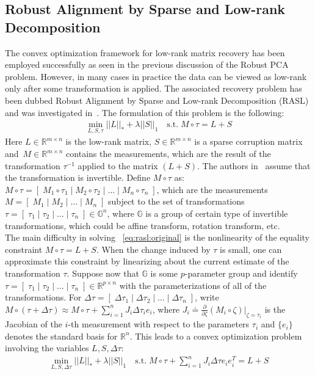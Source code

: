 \subsection{Robust Alignment by Sparse and Low-rank Decomposition}
\label{subsec: RASL}

The convex optimization framework for low-rank matrix recovery has been employed successfully as seen in the previous discussion of the Robust PCA problem. However, in many cases in practice the data can be viewed as low-rank only after some transformation is applied. The associated recovery problem has been dubbed Robust Alignment by Sparse and Low-rank Decomposition (RASL) and was investigated in~\cite{Peng:2010}. The formulation of this problem is the following:
%
\begin{align}
\min_{L, S, \tau}  ||L||_{*} + \lambda||S||_{1} \quad  \text{s.t.} \;  M\circ\tau = L+S
\label{eq:rasl:original}
\end{align}
%
Here $L \in\mathbb{R}^{m\times n}$ is the low-rank matrix, $S\in\mathbb{R}^{m\times n}$ is a sparse corruption matrix and~$M\in\mathbb{R}^{m\times n}$ contains the measurements, which are the result of the transformation $\tau^{-1}$ applied to the matrix $(L+S)$. The authors in~\cite{Peng:2010} assume that the transformation is invertible. Define $M\circ\tau$ as: $M\circ\tau = [\;M_{1}\circ\tau_{1} \;|\;M_{2}\circ\tau_{2} \;|\; \dots \;|\; M_{n}\circ\tau_{n}\;]$, which are the measurements $M=[\;M_{1} \;|\;M_{2} \;|\; \dots \;|\; M_{n}\;]$ subject to the set of transformations $\tau=[\;\tau_{1} \;|\;\tau_{2} \;|\; \dots \;|\; \tau_{n}\;] \in\mathbb{G}^n$, where $\mathbb{G}$ is a group of certain type of invertible transformations, which could be affine transform, rotation transform, etc.  \\

The main difficulty in solving ~\eqref{eq:rasl:original} is the nonlinearity of the equality constraint $M\circ\tau = L+S$. When the change induced by $\tau$ is small, one can approximate this constraint by linearizing about the current estimate of the transformation $\tau$. Suppose now that $\mathbb{G}$ is some $p$-parameter group and identify $\tau=[\;\tau_{1} \;|\;\tau_{2} \;|\; \dots \;|\; \tau_{n}\;] \in \mathbb{R}^{p\times n}$ with the parameterizations of all of the transformations. For $\Delta\tau = [\;\Delta\tau_{1} \;|\; \Delta\tau_{2} \;|\; \dots \;|\; \Delta\tau_{n}\;]$, write $M\circ(\tau+\Delta\tau) \approx M\circ\tau + \sum_{i=1}^n J_{i}\Delta\tau_{i}e_{i}$, where $J_{i} \doteq \frac{\partial}{\partial\zeta}(M_{i}\circ\zeta)|_{\zeta = \tau_{i}}$ is the Jacobian of the $i$-th measurement with respect to the parameters $\tau_{i}$ and $\{e_{i}\}$ denotes the standard basis for $\mathbb{R}^n$. This leads to a convex optimization problem involving the variables $L, S, \Delta\tau$:
%
\begin{align}
\min_{L, S, \Delta\tau}  ||L||_{*} + \lambda||S||_{1}  \quad \text{s.t.} \;  M\circ\tau + \sum_{i=1}^n J_{i}\Delta\tau e_{i}e_{i}^{T}= L+S
\label{eq:rasl:linearized}
\end{align}


